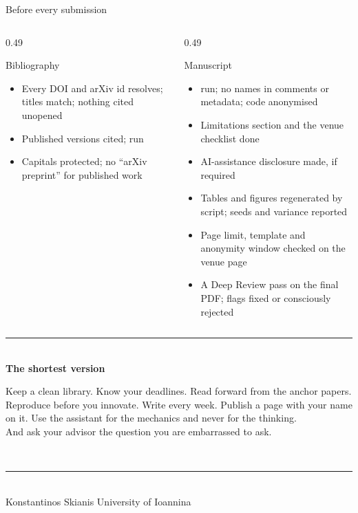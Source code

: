 \documentclass[aspectratio=169,11pt]{beamer}
\begin{document}
\begin{frame}{Before every submission}
\begin{columns}[T]
\begin{column}{0.49\textwidth}
\begin{block}{Bibliography}
\footnotesize
\begin{itemize}
  \item Every DOI and arXiv id resolves; titles match; nothing cited unopened
  \item Published versions cited;  run
  \item Capitals protected; no ``arXiv preprint'' for published work
\end{itemize}
\end{block}
\end{column}
\begin{column}{0.49\textwidth}
\begin{block}{Manuscript}
\footnotesize
\begin{itemize}
  \item {} run; no names in comments or metadata;
        code anonymised
  \item Limitations section and the venue checklist done
  \item AI-assistance disclosure made, if required
  \item Tables and figures regenerated by script; seeds and variance reported
  \item Page limit, template and anonymity window checked on the venue page
  \item A Deep Review pass on the final PDF; flags fixed or consciously rejected
\end{itemize}
\end{block}
\end{column}
\end{columns}
\end{frame}

\begin{frame}
\vfill
\centering
{\color{brandlight}\rule{0.8\textwidth}{1.4pt}}\\[10pt]
{\large\bfseries\color{brand}The shortest version}\\[10pt]
\begin{minipage}{0.8\textwidth}\centering
Keep a clean library. Know your deadlines. Read forward from the anchor papers.
Reproduce before you innovate. Write every week. Publish a page with your name
on it. Use the assistant for the mechanics and never for the thinking.\\[6pt]
And ask your advisor the question you are embarrassed to ask.
\end{minipage}\\[12pt]
{\color{brandlight}\rule{0.8\textwidth}{1.4pt}}\\[14pt]
{\footnotesize\color{mutegray}Konstantinos Skianis \quad\textbullet\quad
University of Ioannina \quad\textbullet\quad
{}}
\vfill
\end{frame}
\end{document}
